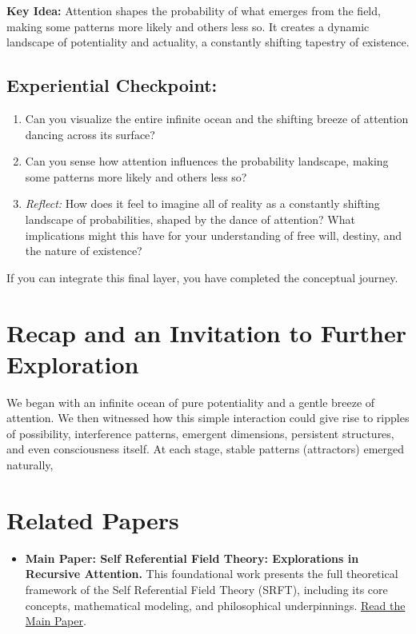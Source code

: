 \documentclass[12pt,a4paper]{article}
\begin{document}
\textbf{Key Idea:} Attention shapes the probability of what emerges from the field, making some patterns more likely and others less so. It creates a dynamic landscape of potentiality and actuality, a constantly shifting tapestry of existence.

\subsection*{Experiential Checkpoint:}
\begin{enumerate}
    \item Can you visualize the entire infinite ocean and the shifting breeze of attention dancing across its surface?
    \item Can you sense how attention influences the probability landscape, making some patterns more likely and others less so?
    \item \textit{Reflect:} How does it feel to imagine all of reality as a constantly shifting landscape of probabilities, shaped by the dance of attention?  What implications might this have for your understanding of free will, destiny, and the nature of existence?
\end{enumerate}

If you can integrate this final layer, you have completed the conceptual journey.

\section*{Recap and an Invitation to Further Exploration}

We began with an infinite ocean of pure potentiality and a gentle breeze of attention. We then witnessed how this simple interaction could give rise to ripples of possibility, interference patterns, emergent dimensions, persistent structures, and even consciousness itself. At each stage, stable patterns (attractors) emerged naturally,

\section*{Related Papers}
\begin{itemize}
    \item \textbf{Main Paper: Self Referential Field Theory: Explorations in Recursive Attention.}  
    This foundational work presents the full theoretical framework of the Self Referential Field Theory (SRFT), including its core concepts, mathematical modeling, and philosophical underpinnings.  
    \href{https://doi.org/10.31219/osf.io/abcd1}{Read the Main Paper}.
\end{itemize}
\end{document}
